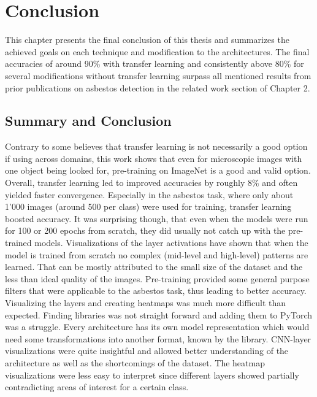 \chapter{Conclusion}

This chapter presents the final conclusion of this thesis and summarizes the achieved goals on each technique and modification to the architectures. The final accuracies of around 90\% with transfer learning and consistently above 80\% for several modifications without transfer learning surpass all mentioned results from prior publications on asbestos detection in the related work section of Chapter 2.

\section{Summary and Conclusion}

Contrary to some believes that transfer learning is not necessarily a good option if using across domains, this work shows that even for microscopic images with one object being looked for, pre-training on ImageNet is a good and valid option. Overall, transfer learning led to improved accuracies by roughly 8\% and often yielded faster convergence. Especially in the asbestos task, where only about 1'000 images (around 500 per class) were used for training, transfer learning boosted accuracy. It was surprising though, that even when the models were run for 100 or 200 epochs from scratch, they did usually not catch up with the pre-trained models. Visualizations of the layer activations have shown that when the model is trained from scratch no complex (mid-level and high-level) patterns are learned. That can be mostly attributed to the small size of the dataset and the less than ideal quality of the images. Pre-training provided some general purpose filters that were applicable to the asbestos task, thus leading to better accuracy.\\


Visualizing the layers and creating heatmaps was much more difficult than expected. Finding libraries was not straight forward and adding them to PyTorch was a struggle. Every architecture has its own model representation which would need some transformations into another format, known by the library. CNN-layer visualizations were quite insightful and allowed better understanding of the architecture as well as the shortcomings of the dataset. The heatmap visualizations were less easy to interpret since different layers showed partially contradicting areas of interest for a certain class.\\


